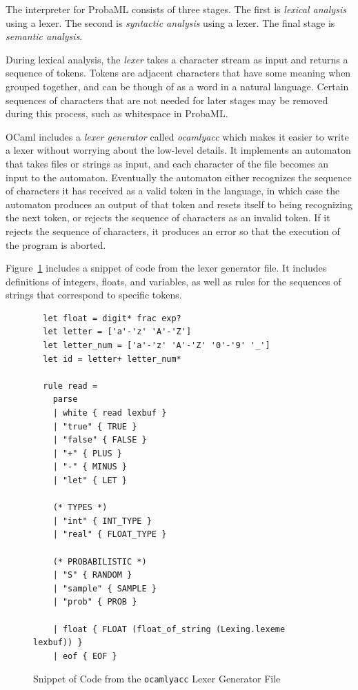 \documentclass[pageno]{jpaper}
\begin{document}
The interpreter for ProbaML consists of three stages. The first is \emph{lexical analysis} using a lexer. The second is \emph{syntactic analysis} using a lexer. The final stage is \emph{semantic analysis}.

During lexical analysis, the \emph{lexer} takes a character stream as input and returns a sequence of tokens. Tokens are adjacent characters that have some meaning when grouped together, and can be though of as a word in a natural language. Certain sequences of characters that are not needed for later stages may be removed during this process, such as whitespace in ProbaML.

OCaml includes a \emph{lexer generator} called \emph{ocamlyacc} which makes it easier to write a lexer without worrying about the low-level details. It implements an automaton that takes files or strings as input, and each character of the file becomes an input to the automaton. Eventually the automaton either recognizes the sequence of characters it has received as a valid token in the language, in which case the automaton produces an output of that token and resets itself to being recognizing the next token, or rejects the sequence of characters as an invalid token. If it rejects the sequence of characters, it produces an error so that the execution of the program is aborted.

Figure~\ref{fig:lexer} includes a snippet of code from the lexer generator file. It includes definitions of integers, floats, and variables, as well as rules for the sequences of strings that correspond to specific tokens.

\begin{figure}[hbt]
  \begin{verbatim}
  let float = digit* frac exp?
  let letter = ['a'-'z' 'A'-'Z']
  let letter_num = ['a'-'z' 'A'-'Z' '0'-'9' '_']
  let id = letter+ letter_num*

  rule read = 
    parse
    | white { read lexbuf }
    | "true" { TRUE }
    | "false" { FALSE }
    | "+" { PLUS }
    | "-" { MINUS }
    | "let" { LET }

    (* TYPES *)
    | "int" { INT_TYPE }
    | "real" { FLOAT_TYPE }

    (* PROBABILISTIC *)
    | "S" { RANDOM }
    | "sample" { SAMPLE }
    | "prob" { PROB }

    | float { FLOAT (float_of_string (Lexing.lexeme lexbuf)) }
    | eof { EOF }
  \end{verbatim}
  \caption{Snippet of Code from the \texttt{ocamlyacc} Lexer Generator File}
  \label{fig:lexer}
\end{figure}
\end{document}
